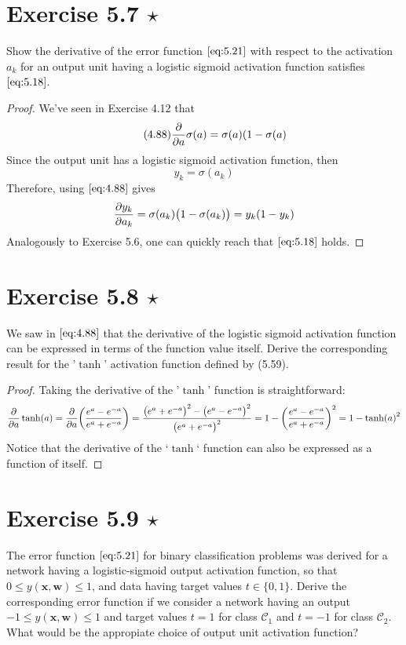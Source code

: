 \section*{Exercise 5.7 $\star$}
Show the derivative of the error function $\eqref{eq:5.21}$ with respect
to the activation $a_k$ for an output unit having a logistic sigmoid activation
function satisfies $\eqref{eq:5.18}$.

\vspace{1em}

\begin{proof}
    We've seen in Exercise 4.12 that
    \begin{equation}\tag{4.88}
        \pdv{a} \sigma(a) = \sigma(a)(1 - \sigma(a)
    \end{equation}
    Since the output unit has a logistic sigmoid activation function, then
    \[
        y_k = \sigma(a_k)
    \] 
    Therefore, using $\eqref{eq:4.88}$ gives
     \[
         \pdv{y_k}{a_k} = \sigma(a_k)\big(1 - \sigma(a_k)\big) = y_k(1 - y_k)
    \] 
    Analogously to Exercise 5.6, one can quickly reach that $\eqref{eq:5.18}$ holds.
\end{proof}

\section*{Exercise 5.8 $\star$}
We saw in $\eqref{eq:4.88}$ that the derivative of the logistic sigmoid
activation function can be expressed in terms of the function value itself.
Derive the corresponding result for the '$\tanh$' activation function defined
by (5.59).

\vspace{1em}

\begin{proof}
    Taking the derivative of the '$\tanh$' function is straightforward:
    \[
        \pdv{a} \tanh(a) 
        = \pdv{a} \bigg(\frac{e^a - e^{-a}}{e^a + e^{-a}}\bigg)
        = \frac{\big(e^a + e^{-a}\big)^2 - \big(e^a - e^{-a}\big)^2}{\big(e^a + e^{-a}\big)^2}
        = 1 - \bigg(\frac{e^a - e^{-a}}{e^a + e^{-a}}\bigg)^2
        = 1 - \tanh(a)^2
    \] 
    Notice that the derivative of the `$\tanh$` function can also be expressed
    as a function of itself.
\end{proof}

\section*{Exercise 5.9 $\star$}
The error function $\eqref{eq:5.21}$ for binary classification problems
was derived for a network having a logistic-sigmoid output activation
function, so that $0 \leq y(\mathbf{x}, \mathbf{w}) \leq 1$, and data having
target values $t \in \{0, 1\}$. Derive the corresponding error function
if we consider a network having an output $-1 \leq y(\mathbf{x}, \mathbf{w}) \leq 1$
and target values $t = 1$ for class $\mathcal{C}_1$ and $t = -1$ for
class  $\mathcal{C}_2$. What would be the appropiate choice of output
unit activation function?

